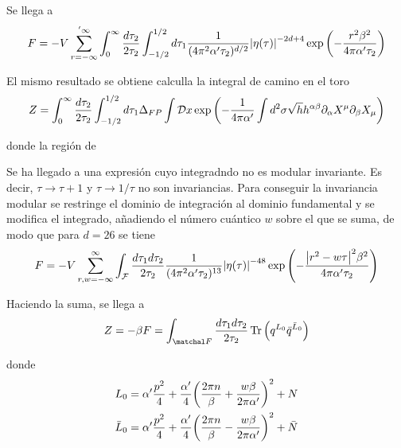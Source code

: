 Se llega a
\begin{equation}
  F=-V \sum_{r=-\infty}^{'\infty} \int_0^\infty\frac{d\tau_2}{2\tau_2} \int_{-1/2}^{1/2} d\tau_1  \frac{1}{(4\pi^2\alpha'\tau_2)^{d/2}}
  \abs{\eta(\tau)}^{-2d+4}\exp\qty(-\frac{r^2\beta^2}{4\pi\alpha'\tau_2})
\end{equation}

El mismo resultado se obtiene calculla la integral de camino en el toro
\begin{equation}
  Z= \int_0^\infty\frac{d\tau_2}{2\tau_2} \int_{-1/2}^{1/2} d\tau_1 \Delta_{FP} \int \mathcal Dx
  \exp\qty(-\frac{1}{4\pi\alpha'}\int d^2\sigma \sqrt h h^{\alpha\beta}\partial_\alpha X^\mu \partial_\beta X_\mu)
\end{equation}

donde la región de 

Se ha llegado a una expresión cuyo integradndo no es modular invariante. Es decir, 
$\tau\to\tau+1$ y $\tau\to1/\tau$ no son invariancias.
Para conseguir la invariancia modular se restringe el dominio de integración al dominio
fundamental y se modifica el integrado, añadiendo el número cuántico $w$ sobre el que 
se suma, de modo que para $d=26$ se tiene
\begin{equation}
  F=-V \sum_{r,w=-\infty}^{\infty} \int_\mathcal{F}  \frac{d\tau_1d\tau_2}{2\tau_2}   \frac{1}{(4\pi^2\alpha'\tau_2)^{13}}
  \abs{\eta(\tau)}^{-48}\exp\qty(-\frac{\abs{r^2-w\tau}^2\beta^2}{4\pi\alpha'\tau_2})
\end{equation}

Haciendo la suma, se llega a
\begin{equation}
  Z=-\beta F=\int_{\matchal F}\frac{d\tau_1d\tau_2}{2\tau_2}\Tr\qty(q^{L_0}\bar q^{\bar L_0})
\end{equation}

donde
\begin{align}
  L_0&=\alpha'\frac{p^2}{4}+\frac{\alpha'}{4}\qty(\frac{2\pi n}{\beta}+\frac{w\beta}{2\pi\alpha'})^2+N\\ 
 \bar L_0&=\alpha'\frac{p^2}{4}+\frac{\alpha'}{4}\qty(\frac{2\pi n}{\beta}-\frac{w\beta}{2\pi\alpha'})^2+\bar N
\end{align}


%

